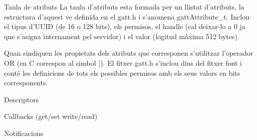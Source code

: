 Taula de atributs
La taula d'atributs esta formada per un llistat d'atributs, la estructura d'aquest ve definida en el gatt.h i s'anomena gattAttribute\_t.
Inclou el tipus d'UUID (de 16 o 128 bits), els permisos, el handle (cal deixar-lo a 0 ja que s'asigna internament pel servidor) i el valor (logitud màxima 512 bytes).

Quan sindiquen les propietats dels atributs que corresponen s'utilitzar l'operador OR (en C correspon al simbol |).
El fitxer gatt.h s'inclou dins del fitxer font i conté les definicions de tots els possibles permisos amb els seus valors en bits corresponents.

Descriptors


Callbacks (get/set write/read)


Notificacions



